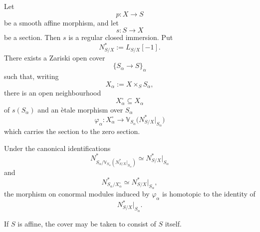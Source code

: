 \begin{theorem}
\label{thm:spectral-tubular-neighbourhood}
Let
\[
    p
    \colon
    X
    \longrightarrow
    S
\]
be a smooth affine morphism, and let
\[
    s
    \colon
    S
    \longrightarrow
    X
\]
be a section. Then $s$ is a regular closed immersion. Put
\[
    N^*_{S/X}
    :=
    L_{S/X}[-1].
\]
There exists a Zariski open cover
\[
    \{S_\alpha\to S\}_\alpha
\]
such that, writing
\[
    X_\alpha
    :=
    X\times_SS_\alpha,
\]
there is an open neighbourhood
\[
    X_\alpha^\circ
    \subseteq
    X_\alpha
\]
of $s(S_\alpha)$ and an \`etale morphism over $S_\alpha$
\[
    \varphi_\alpha
    \colon
    X_\alpha^\circ
    \longrightarrow
    \mathbb V_{S_\alpha}
    \bigl(
        N^*_{S/X}|_{S_\alpha}
    \bigr)
\]
which carries the section to the zero section.

Under the canonical identifications
\[
    N^*_{S_\alpha/
    \mathbb V_{S_\alpha}
    (N^*_{S/X}|_{S_\alpha})}
    \simeq
    N^*_{S/X}|_{S_\alpha}
\]
and
\[
    N^*_{S_\alpha/X_\alpha^\circ}
    \simeq
    N^*_{S/X}|_{S_\alpha},
\]
the morphism on conormal modules induced by \(\varphi_\alpha\)
is homotopic to the identity of
\[
    N^*_{S/X}|_{S_\alpha}.
\]

If $S$ is affine, the cover may be taken to consist of $S$ itself.
\end{theorem}

